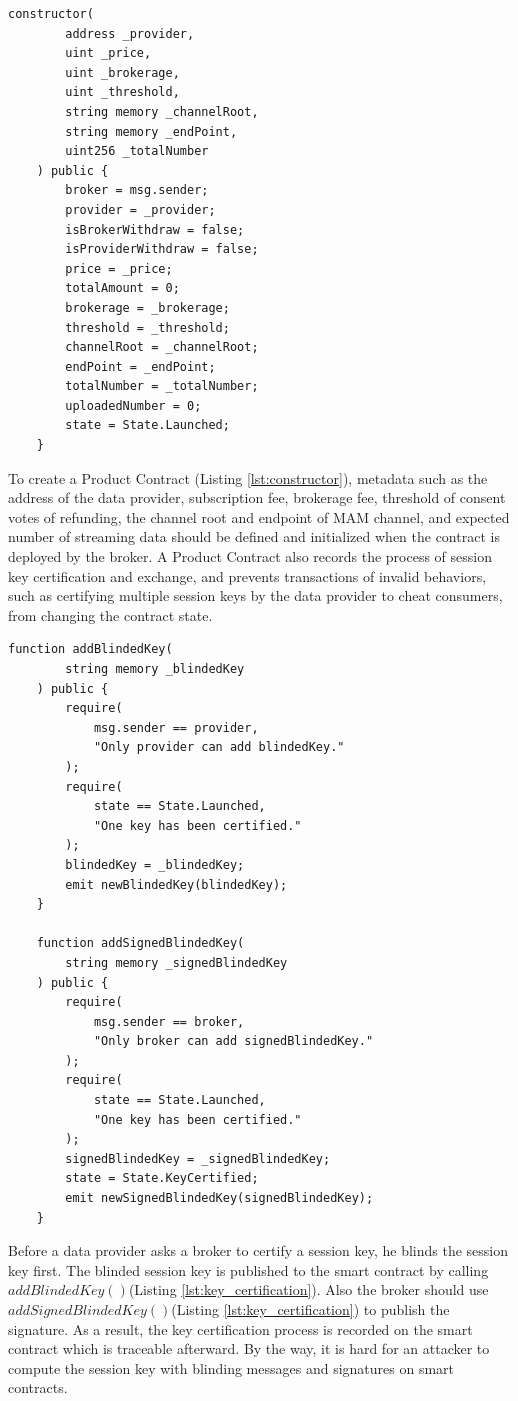 \documentclass[journal,article,applsci,submit,moreauthors,pdftex]{Definitions/mdpi}
\begin{document}
\begin{lstlisting}[caption={Product Contract constructor and data fields}, label={lst:constructor}, frame=single]
	constructor(
		address _provider,
		uint _price,
		uint _brokerage,
		uint _threshold,
		string memory _channelRoot,
		string memory _endPoint,
		uint256 _totalNumber
	) public {
		broker = msg.sender;
		provider = _provider;
		isBrokerWithdraw = false;
		isProviderWithdraw = false;
		price = _price;
		totalAmount = 0;
		brokerage = _brokerage;
		threshold = _threshold;
		channelRoot = _channelRoot;
		endPoint = _endPoint;
		totalNumber = _totalNumber;
		uploadedNumber = 0;
		state = State.Launched;
	}
\end{lstlisting}

To create a Product Contract (Listing \ref{lst:constructor}), metadata such as the address of the data provider, subscription fee, brokerage fee, threshold of consent votes of refunding, the channel root and endpoint of MAM channel, and expected number of streaming data should be defined and initialized when the contract is deployed by the broker. A Product Contract also records the process of session key certification and exchange, and prevents transactions of invalid behaviors, such as certifying multiple session keys by the data provider to cheat consumers, from changing the contract state.

\begin{lstlisting}[caption={Functions of blinded key update and signature update}, label={lst:key_certification}, frame=single]
	function addBlindedKey(
		string memory _blindedKey
	) public {
		require(
			msg.sender == provider,
			"Only provider can add blindedKey."
		);
		require(
			state == State.Launched,
			"One key has been certified."
		);
		blindedKey = _blindedKey;
		emit newBlindedKey(blindedKey);
	}
	
	function addSignedBlindedKey(
		string memory _signedBlindedKey
	) public {
		require(
			msg.sender == broker,
			"Only broker can add signedBlindedKey."
		);
		require(
			state == State.Launched,
			"One key has been certified."
		);
		signedBlindedKey = _signedBlindedKey;
		state = State.KeyCertified;
		emit newSignedBlindedKey(signedBlindedKey);
	}
\end{lstlisting}

Before a data provider asks a broker to certify a session key, he blinds the session key first. The blinded session key is published to the smart contract by calling $addBlindedKey()$(Listing \ref{lst:key_certification}). Also the broker should use $addSignedBlindedKey()$(Listing \ref{lst:key_certification}) to publish the signature. As a result, the key certification process is recorded on the smart contract which is traceable afterward. By the way, it is hard for an attacker to compute the session key with blinding messages and signatures on smart contracts.
\end{document}
